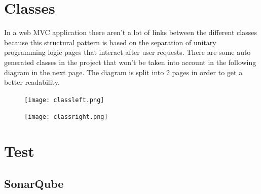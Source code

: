 \documentclass[12pt]{article}
\begin{document}
\section{Classes}
In a web MVC application there aren't a lot of links between the different classes because this structural pattern is based on the separation of unitary programming logic pages that interact after user requests.
There are some auto generated classes in the project that won't be taken into account in the following diagram in the next page.
The diagram is split into 2 pages in order to get a better readability.
\begin{figure}[H]
\texttt{[image: classleft.png]}
\end{figure}
\begin{figure}[H]
\texttt{[image: classright.png]}
\end{figure}
\section{Test}
\subsection{SonarQube}
\end{document}
